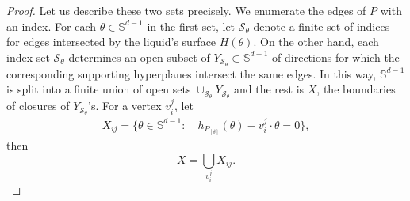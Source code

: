 \documentclass[12pt,letterpaper,reqno]{amsart}
\begin{document}
\begin{proof}
Let us describe these two sets precisely. 
We enumerate the edges of $P$ with an index. 
For each $\theta \in \mathbb{S}^{d-1}$ in the first set, let $\mathcal{S_\theta}$ denote a finite set of indices for edges intersected by the liquid's surface $H(\theta)$. 
On the other hand, each index set $\mathcal{S_\theta}$ determines an open subset of $Y_\mathcal{S_\theta} \subset \mathbb{S}^{d-1}$ of directions for which the corresponding supporting hyperplanes intersect the same edges. 
In this way, $\mathbb{S}^{d-1}$ is split into a finite union of open sets $\cup_{\mathcal{S_\theta}}Y_\mathcal{S_\theta}$ and the rest is $X$, the boundaries of closures of $Y_\mathcal{S_\theta}$'s. 
For a vertex $v_i^j$, let 
\begin{align*}
X_{ij}=\Big\{\theta \in \mathbb{S}^{d-1}: \quad
h_{P_{[\delta]}}(\theta)-v_i^j\cdot  \theta =
0\Big\},
\end{align*}
then
$$
X = \bigcup_{v_i^j} X_{ij}.
$$



\end{proof}
\end{document}
